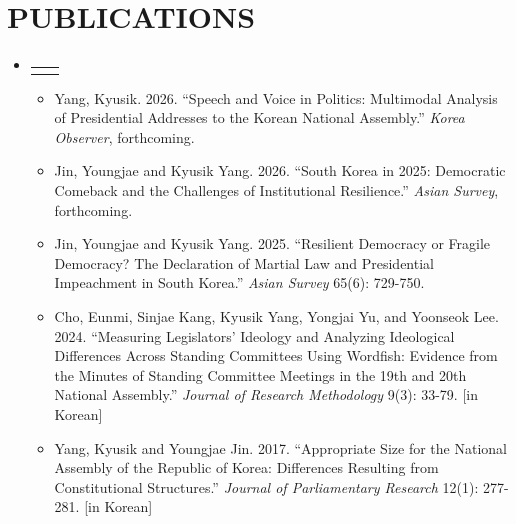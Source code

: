 \documentclass[a4paper,11pt]{article}
\makeatletter
\newcommand{\resumeItem}[1]{
  \item\small{
    {#1 \vspace{-2pt}}
  }
}
\newcommand{\resumeProjectHeading}[2]{
    \item
    \begin{tabular*}{1.001\textwidth}{l@{\extracolsep{\fill}}r}
      \small#1 & \textbf{\small #2}\\
    \end{tabular*}\vspace{-7pt}
}
\newcommand{\resumeSubHeadingListStart}{\begin{itemize}[leftmargin=0.0in, label={}]}
\newcommand{\resumeSubHeadingListEnd}{\end{itemize}}
\newcommand{\resumeItemListStart}{\begin{itemize}}
\newcommand{\resumeItemListEnd}{\end{itemize}\vspace{-5pt}}
\makeatother
\begin{document}
\section{PUBLICATIONS}
    \vspace{-4pt}
    \resumeSubHeadingListStart
      \resumeProjectHeading
          {}{}
        \vspace{-25pt}
          \resumeItemListStart
            \resumeItem{Yang, Kyusik. 2026. ``Speech and Voice in Politics: Multimodal Analysis of Presidential Addresses to the Korean National Assembly.'' \emph{Korea Observer}, forthcoming.}\\[0.7em]
            \resumeItem{Jin, Youngjae and Kyusik Yang. 2026. ``South Korea in 2025: Democratic Comeback and the Challenges of Institutional Resilience.'' \emph{Asian Survey}, forthcoming.}\\[0.7em]
            \resumeItem{Jin, Youngjae and Kyusik Yang. 2025. ``Resilient Democracy or Fragile Democracy? The Declaration of Martial Law and Presidential Impeachment in South Korea.'' \emph{Asian Survey} 65(6): 729-750.}\\[0.7em]
            \resumeItem{Cho, Eunmi, Sinjae Kang, Kyusik Yang, Yongjai Yu, and Yoonseok Lee. 2024. ``Measuring Legislators' Ideology and Analyzing Ideological Differences Across Standing Committees Using Wordfish: Evidence from the Minutes of Standing Committee Meetings in the 19th and 20th National Assembly.'' \emph{Journal of Research Methodology} 9(3): 33-79. [in Korean]}\\[0.7em]
            \resumeItem{Yang, Kyusik and Youngjae Jin. 2017. ``Appropriate Size for the National Assembly of the Republic of Korea: Differences Resulting from Constitutional Structures.'' \emph{Journal of Parliamentary Research} 12(1): 277-281. \hspace{40pt} [in Korean]}
          \resumeItemListEnd
          \vspace{-10pt}

    \resumeSubHeadingListEnd
\vspace{0pt}
\end{document}
